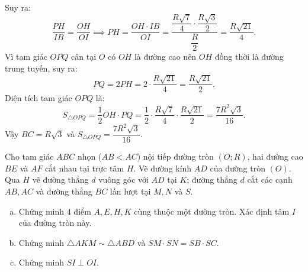 \begin{bt}
{\begin{enumerate}[a)]
	Suy ra:
	$$\dfrac{PH}{IB} = \dfrac{OH}{OI} \implies PH = \dfrac{OH \cdot IB}{OI} = \dfrac{\dfrac{R\sqrt{7}}{4} \cdot \dfrac{R\sqrt{3}}{2}}{\dfrac{R}{2}} = \dfrac{R\sqrt{21}}{4}.$$
	Vì tam giác $OPQ$ cân tại $O$ có $OH$ là đường cao nên $OH$ đồng thời là đường trung tuyến, suy ra:
	$$PQ = 2PH = 2 \cdot \dfrac{R\sqrt{21}}{4} = \dfrac{R\sqrt{21}}{2}.$$
	Diện tích tam giác $OPQ$ là:
	$$S_{\triangle OPQ} = \dfrac{1}{2} OH \cdot PQ = \dfrac{1}{2} \cdot \dfrac{R\sqrt{7}}{4} \cdot \dfrac{R\sqrt{21}}{2} = \dfrac{7R^2\sqrt{3}}{16}.$$
	Vậy $BC = R\sqrt{3}$ và $S_{\triangle OPQ} = \dfrac{7R^2\sqrt{3}}{16}$.
\end{enumerate}
}
\end{bt}

\begin{bt}%
Cho tam giác $ABC$ nhọn ($AB < AC$) nội tiếp đường tròn $(O; R)$, hai đường cao $BE$ và $AF$ cắt nhau tại trực tâm $H$. Vẽ đường kính $AD$ của đường tròn $(O)$. Qua $H$ vẽ đường thẳng $d$ vuông góc với $AD$ tại $K$; đường thẳng $d$ cắt các cạnh $AB, AC$ và đường thẳng $BC$ lần lượt tại $M, N$ và $S$.
\begin{enumerate}[a)]
	\item Chứng minh $4$ điểm $A, E, H, K$ cùng thuộc một đường tròn. Xác định tâm $I$ của đường tròn này.
	\item Chứng minh $\triangle AKM \sim \triangle ABD$ và $SM \cdot SN = SB \cdot SC$.
	\item Chứng minh $SI \perp OI$.
\end{enumerate}
\end{bt}
